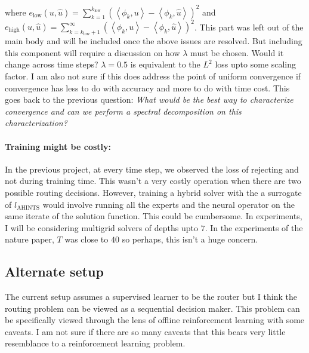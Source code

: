 \documentclass[12pt]{article}
\begin{document}
where $e_{\text{low}}(u, \widehat{u}) = \sum_{k = 1}^{k_{\text{low}}} \left(\left<\phi_k, u \right> - \left<\phi_k, \widehat{u}\right>\right)^2$ and $e_{\text{high}}(u, \widehat{u}) = \sum_{k = k_{\text{low}} + 1}^{\infty} \left(\left<\phi_k, u \right> - \left<\phi_k, \widehat{u}\right>\right)^2$. This part was left out of the main body and will be included once the above issues are resolved. But including this component will require a discussion on how $\lambda$ must be chosen. Would it change across time steps? $\lambda = 0.5$ is equivalent to the $L^2$ loss upto some scaling factor. I am also not sure if this does address the point of uniform convergence if convergence has less to do with accuracy and more to do with time cost. This goes back to the previous question: \textit{What would be the best way to characterize convergence and can we perform a spectral decomposition on this characterization?}

\paragraph{Training might be costly:} In the previous project, at every time step, we observed the loss of rejecting and not during training time. This wasn't a very costly operation when there are two possible routing decisions. However, training a hybrid solver with the a surrogate of $l_{\text{AHINTS}}$ would involve running all the experts and the neural operator on the same iterate of the solution function. This could be cumbersome. In experiments, I will be considering multigrid solvers of depths upto $7$. In the experiments of the nature paper, $T$ was close to $40$ so perhaps, this isn't a huge concern. 


\subsection{Alternate setup} \label{sec:alternatesetup}

The current setup assumes a supervised learner to be the router but I think the routing problem can be viewed as a sequential decision maker. This problem can be specifically viewed through the lens of offline reinforcement learning with some caveats. I am not sure if there are so many caveats that this bears very little resemblance to a reinforcement learning problem. 
\end{document}
